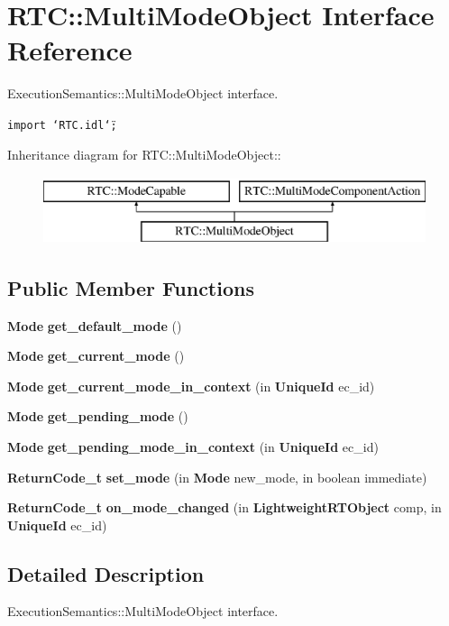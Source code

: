 \section{RTC::Multi\-Mode\-Object Interface Reference}
\label{interfaceRTC_1_1MultiModeObject}
Execution\-Semantics::Multi\-Mode\-Object interface.  


{\tt import \char`\"{}RTC.idl\char`\"{};}

Inheritance diagram for RTC::Multi\-Mode\-Object::\begin{figure}[H]
\begin{center}
\leavevmode
\includegraphics[height=2cm]{interfaceRTC_1_1MultiModeObject}
\end{center}
\end{figure}
\subsection*{Public Member Functions}
\begin{CompactItemize}
\item 
{\bf Mode} {\bf get\_\-default\_\-mode} ()
\item 
{\bf Mode} {\bf get\_\-current\_\-mode} ()
\item 
{\bf Mode} {\bf get\_\-current\_\-mode\_\-in\_\-context} (in {\bf Unique\-Id} ec\_\-id)
\item 
{\bf Mode} {\bf get\_\-pending\_\-mode} ()
\item 
{\bf Mode} {\bf get\_\-pending\_\-mode\_\-in\_\-context} (in {\bf Unique\-Id} ec\_\-id)
\item 
{\bf Return\-Code\_\-t} {\bf set\_\-mode} (in {\bf Mode} new\_\-mode, in boolean immediate)
\item 
{\bf Return\-Code\_\-t} {\bf on\_\-mode\_\-changed} (in {\bf Lightweight\-RTObject} comp, in {\bf Unique\-Id} ec\_\-id)
\end{CompactItemize}


\subsection{Detailed Description}
Execution\-Semantics::Multi\-Mode\-Object interface. 



